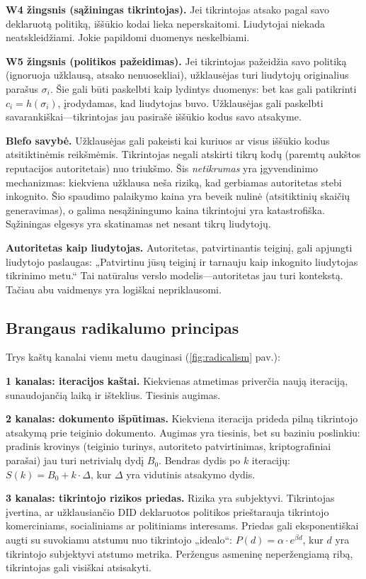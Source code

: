 \documentclass[11pt,a4paper,twocolumn]{article}
\begin{document}
\textbf{W4 žingsnis (sąžiningas tikrintojas).} Jei tikrintojas atsako pagal savo deklaruotą politiką, iššūkio kodai lieka neperskaitomi. Liudytojai niekada neatskleidžiami. Jokie papildomi duomenys neskelbiami.

\textbf{W5 žingsnis (politikos pažeidimas).} Jei tikrintojas pažeidžia savo politiką (ignoruoja užklausą, atsako nenuosekliai), užklausėjas turi liudytojų originalius parašus $\sigma_i$. Šie gali būti paskelbti kaip lydintys duomenys: bet kas gali patikrinti $c_i = h(\sigma_i)$, įrodydamas, kad liudytojas buvo. Užklausėjas gali paskelbti savarankiškai---tikrintojas jau pasirašė iššūkio kodus savo atsakyme.

\textbf{Blefo savybė.} Užklausėjas gali pakeisti kai kuriuos ar visus iššūkio kodus atsitiktinėmis reikšmėmis. Tikrintojas negali atskirti tikrų kodų (paremtų aukštos reputacijos autoritetais) nuo triukšmo. Šis \emph{netikrumas} yra įgyvendinimo mechanizmas: kiekviena užklausa neša riziką, kad gerbiamas autoritetas stebi inkognito. Šio spaudimo palaikymo kaina yra beveik nulinė (atsitiktinių skaičių generavimas), o galima nesąžiningumo kaina tikrintojui yra katastrofiška. Sąžiningas elgesys yra skatinamas net nesant tikrų liudytojų.

\textbf{Autoritetas kaip liudytojas.} Autoritetas, patvirtinantis teiginį, gali apjungti liudytojo paslaugas: „Patvirtinu jūsų teiginį ir tarnauju kaip inkognito liudytojas tikrinimo metu.“ Tai natūralus verslo modelis---autoritetas jau turi kontekstą. Tačiau abu vaidmenys yra logiškai nepriklausomi.

\subsection{Brangaus radikalumo principas}

Trys kaštų kanalai vienu metu dauginasi (\ref{fig:radicalism} pav.):

\textbf{1 kanalas: iteracijos kaštai.} Kiekvienas atmetimas priverčia naują iteraciją, sunaudojančią laiką ir išteklius. Tiesinis augimas.

\textbf{2 kanalas: dokumento išpūtimas.} Kiekviena iteracija prideda pilną tikrintojo atsakymą prie teiginio dokumento. Augimas yra tiesinis, bet su baziniu poslinkiu: pradinis krovinys (teiginio turinys, autoriteto patvirtinimas, kriptografiniai parašai) jau turi netrivialų dydį $B_0$. Bendras dydis po $k$ iteracijų: $S(k) = B_0 + k \cdot \Delta$, kur $\Delta$ yra vidutinis atsakymo dydis.

\textbf{3 kanalas: tikrintojo rizikos priedas.} Rizika yra subjektyvi. Tikrintojas įvertina, ar užklausiančio DID deklaruotos politikos prieštarauja tikrintojo komerciniams, socialiniams ar politiniams interesams. Priedas gali eksponentiškai augti su suvokiamu atstumu nuo tikrintojo „idealo“: $P(d) = \alpha \cdot e^{\beta d}$, kur $d$ yra tikrintojo subjektyvi atstumo metrika. Peržengus asmeninę neperžengiamą ribą, tikrintojas gali visiškai atsisakyti.
\end{document}
